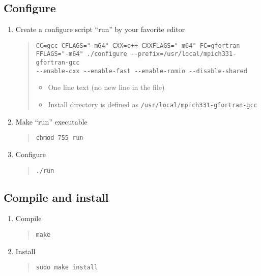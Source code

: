 \documentclass[11pt]{article}
\begin{document}
\subsection{Configure}
\begin{enumerate}
\item
Create a configure script ``run'' by your favorite editor

\begin{quote}
\begin{verbatim}
CC=gcc CFLAGS="-m64" CXX=c++ CXXFLAGS="-m64" FC=gfortran
FFLAGS="-m64" ./configure --prefix=/usr/local/mpich331-gfortran-gcc
--enable-cxx --enable-fast --enable-romio --disable-shared
\end{verbatim}

\begin{itemize}
\item
One line text (no new line in the file)
\item
Install directory is defined as
\verb|/usr/local/mpich331-gfortran-gcc|
\end{itemize}
\end{quote}

\item
Make ``run'' executable 
\begin{quote}
\begin{verbatim}
chmod 755 run
\end{verbatim}
\end{quote}

\item
Configure
\begin{quote}
\begin{verbatim}
./run
\end{verbatim}
\end{quote}
\end{enumerate}

\subsection{Compile and install}
\begin{enumerate}
\item
Compile
\begin{quote}
\begin{verbatim}
make
\end{verbatim}
\end{quote}
\item
Install
\begin{quote}
\begin{verbatim}
sudo make install
\end{verbatim}
\end{quote}
\end{enumerate}
\end{document}
